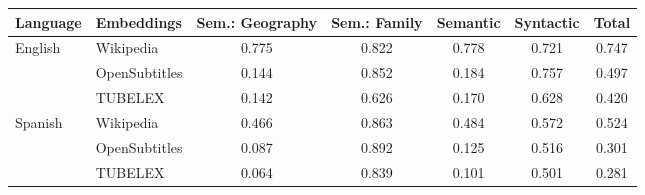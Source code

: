 \begin{tabular}{llccccc}
\toprule
Language & Embeddings & Sem.: Geography & Sem.: Family & Semantic & Syntactic & Total \\
\midrule
\multirow[c]{3}{*}{English} & Wikipedia & 0.775 & 0.822 & 0.778 & 0.721 & 0.747 \\
 & OpenSubtitles & 0.144 & 0.852 & 0.184 & 0.757 & 0.497 \\
 & TUBELEX & 0.142 & 0.626 & 0.170 & 0.628 & 0.420 \\
\hline
\multirow[c]{3}{*}{Spanish} & Wikipedia & 0.466 & 0.863 & 0.484 & 0.572 & 0.524 \\
 & OpenSubtitles & 0.087 & 0.892 & 0.125 & 0.516 & 0.301 \\
 & TUBELEX & 0.064 & 0.839 & 0.101 & 0.501 & 0.281 \\
\bottomrule
\end{tabular}
